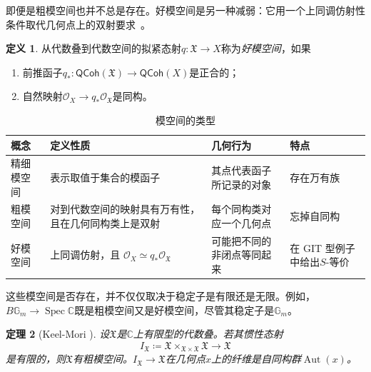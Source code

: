 \documentclass{amsart}
\newtheorem{thm}{定理}[section]
\theoremstyle{definition}
\newtheorem{defn}[thm]{定义}
\theoremstyle{remark}
\theoremstyle{plain}
\theoremstyle{definition}
\theoremstyle{remark}
\newcommand{\G}{\mathbb{G}}
\newcommand{\C}{\mathbb{C}}
\newcommand{\mc}[1]{\mathcal{#1}}
\newcommand{\mf}[1]{\mathfrak{#1}}
\newcommand{\on}[1]{\operatorname{#1}}
\newcommand{\ms}[1]{\mathsf{#1}}
\newcommand{\1}{\mathbf{1}}
\newcommand{\2}{\mathbf{2}}
\newcommand{\3}{\mathbf{3}}
\begin{document}
即便是粗模空间也并不总是存在。好模空间是另一种减弱：它用一个上同调仿射性条件取代几何点上的双射要求~\cite{Alper2013}。

\begin{defn}
    从代数叠到代数空间的拟紧态射\(q\colon\mf{X}\to X\)称为\textit{好模空间}，如果
    \begin{enumerate}
        \item 前推函子\(q_*\colon\ms{QCoh}(\mf{X})\to\ms{QCoh}(X)\)是正合的；
        \item 自然映射\(\mc{O}_X\to q_*\mc{O}_{\mf{X}}\)是同构。
    \end{enumerate}
\end{defn}

\begin{table}[htpb]
    \centering
    \caption{模空间的类型}
    \label{tab:moduli-types-corrected}
    \renewcommand{\arraystretch}{1.3}
    \begin{tabular}{
        p{}
        p{}
        p{}
        p{}
    }
        \toprule
        \textbf{概念}
        & \textbf{定义性质}
        & \textbf{几何行为}
        & \textbf{特点}
        \\
        \midrule
        精细模空间
        & 表示取值于集合的模函子
        & 其点代表函子所记录的对象
        & 存在万有族
        \\
        粗模空间
        & 对到代数空间的映射具有万有性，且在几何同构类上是双射
        & 每个同构类对应一个几何点
        & 忘掉自同构
        \\
        好模空间
        & 上同调仿射，且
          \(\mc{O}_X \simeq q_*\mc{O}_{\mf{X}}\)
        & 可能把不同的非闭点等同起来
        & 在 GIT 型例子中给出\(S\)-等价
        \\
        \bottomrule
    \end{tabular}
\end{table}

这些模空间是否存在，并不仅仅取决于稳定子是有限还是无限。例如，\(B\G_m\to\on{Spec}\C\)既是粗模空间又是好模空间，尽管其稳定子是\(\G_m\)。

\begin{thm}[Keel-Mori {\cite{KeelMori1997}}]
    设\(\mf{X}\)是\(\C\)上有限型的代数叠。若其惯性态射
    \[
        I_{\mf{X}}
        \coloneqq
        \mf{X}\times_{\mf{X}\times\mf{X}}\mf{X}
        \longrightarrow \mf{X}
    \]
    是有限的，则\(\mf{X}\)有粗模空间。\(I_{\mf{X}}\to\mf{X}\)在几何点\(x\)上的纤维是自同构群\(\on{Aut}(x)\)。
\end{thm}
\end{document}
